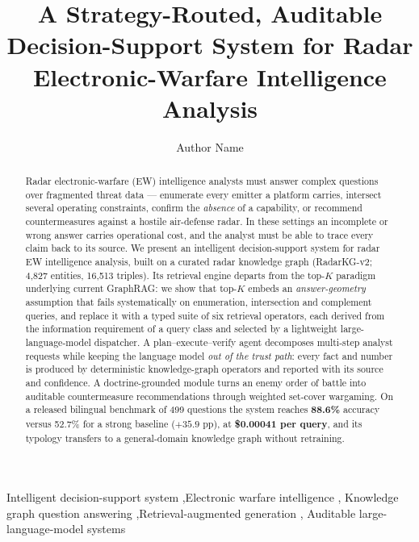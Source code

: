 \documentclass[review]{elsarticle}
\begin{document}
\begin{frontmatter}

\title{A Strategy-Routed, Auditable Decision-Support System for Radar
Electronic-Warfare Intelligence Analysis}

\author{Author Name}

\begin{abstract}
Radar electronic-warfare (EW) intelligence analysts must answer complex
questions over fragmented threat data --- enumerate every emitter a platform
carries, intersect several operating constraints, confirm the \emph{absence}
of a capability, or recommend countermeasures against a hostile air-defense
radar. In these settings an incomplete or wrong answer carries operational
cost, and the analyst must be able to trace every claim back to its source.
We present an intelligent decision-support system for radar EW intelligence
analysis, built on a curated radar knowledge graph (RadarKG-v2; 4{,}827
entities, 16{,}513 triples). Its retrieval engine departs from the top-$K$
paradigm underlying current GraphRAG: we show that top-$K$ embeds an
\emph{answer-geometry} assumption that fails systematically on enumeration,
intersection and complement queries, and replace it with a typed suite of six
retrieval operators, each derived from the information requirement of a query
class and selected by a lightweight large-language-model dispatcher. A
plan--execute--verify agent decomposes multi-step analyst requests while
keeping the language model \emph{out of the trust path}: every fact and number
is produced by deterministic knowledge-graph operators and reported with its
source and confidence. A doctrine-grounded module turns an enemy order of
battle into auditable countermeasure recommendations through weighted
set-cover wargaming. On a released bilingual benchmark of 499 questions the
system reaches \textbf{88.6\%} accuracy versus 52.7\% for a strong baseline
($+35.9$ pp), at \textbf{\$0.00041 per query}, and its typology transfers to a
general-domain knowledge graph without retraining.
\end{abstract}

\begin{keyword}
Intelligent decision-support system \sep Electronic warfare intelligence \sep
Knowledge graph question answering \sep Retrieval-augmented generation \sep
Auditable large-language-model systems
\end{keyword}

\end{frontmatter}
\end{document}
